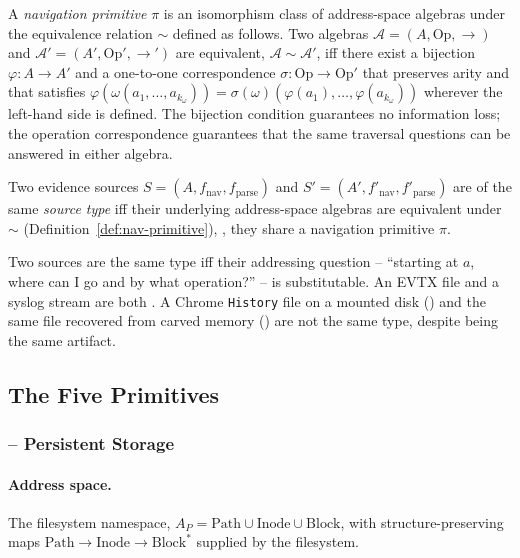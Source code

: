 \begin{definition}
\label{def:nav-primitive}
A \emph{navigation primitive} $\pi$ is an isomorphism class of address-space
algebras under the equivalence relation $\sim$ defined as follows. Two
algebras $\mathcal{A} = (A, \mathrm{Op}, \to)$ and $\mathcal{A}' = (A',
\mathrm{Op}', \to')$ are equivalent, $\mathcal{A} \sim \mathcal{A}'$, iff
there exist a bijection $\varphi : A \to A'$ and a one-to-one
correspondence $\sigma : \mathrm{Op} \to \mathrm{Op}'$ that preserves arity
and that satisfies $\varphi(\omega(a_1, \ldots, a_{k_\omega})) =
\sigma(\omega)(\varphi(a_1), \ldots, \varphi(a_{k_\omega}))$ wherever the
left-hand side is defined. The bijection condition guarantees no
information loss; the operation correspondence guarantees that the same
traversal questions can be answered in either algebra.
\end{definition}

\begin{definition}
\label{def:source-type}
Two evidence sources $S = (A, f_{\mathrm{nav}}, f_{\mathrm{parse}})$ and
$S' = (A', f'_{\mathrm{nav}}, f'_{\mathrm{parse}})$ are of the same
\emph{source type} iff their underlying address-space algebras are equivalent
under $\sim$ (Definition~\ref{def:nav-primitive}), \ie{}, they share a
navigation primitive $\pi$.
\end{definition}

Two sources are the same type iff their addressing question -- ``starting at
$a$, where can I go and by what operation?'' -- is substitutable. An EVTX
file and a syslog stream are both . A Chrome \texttt{History} file on
a mounted disk () and the same file recovered from carved memory ()
are not the same type, despite being the same artifact.

\subsection{The Five Primitives}

\subsubsection{ -- Persistent Storage}

\paragraph{Address space.} The filesystem namespace, $A_{P} = \mathrm{Path}
\cup \mathrm{Inode} \cup \mathrm{Block}$, with structure-preserving maps
$\mathrm{Path} \to \mathrm{Inode} \to \mathrm{Block}^{*}$ supplied by the
filesystem.
